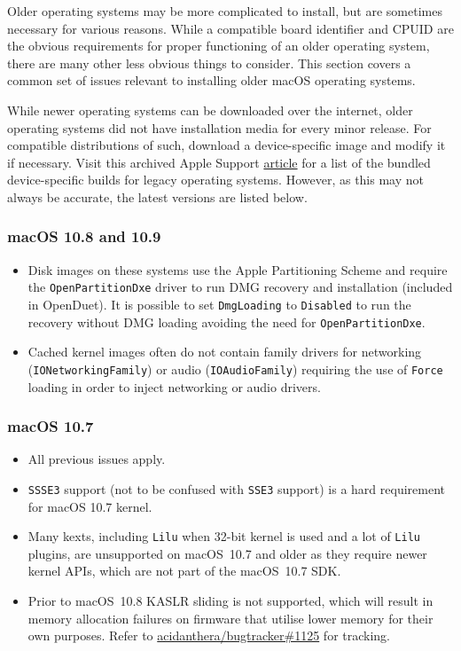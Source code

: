 \documentclass[]{article}
\makeatletter
\renewcommand{\label}[1]{%
\zref@wrapper@immediate{\oldlabel{#1}}}  %
\makeatother
\begin{document}
Older operating systems may be more complicated to install, but are sometimes
necessary for various reasons. While a compatible board identifier
and CPUID are the obvious requirements for proper functioning of an older
operating system, there are many other less obvious things to consider.
This section covers a common set of issues relevant to installing
older macOS operating systems.

While newer operating systems can be downloaded over the internet,
older operating systems did not have installation media for every minor
release. For compatible distributions of such, download a device-specific
image and modify it if necessary. Visit this archived Apple Support
\href{https://web.archive.org/web/20170705003629/https://support.apple.com/en-us/HT204319}{article}
for a list of the bundled device-specific builds for legacy operating systems.
However, as this may not always be accurate, the latest versions are listed below.

\subsubsection{macOS 10.8 and 10.9}\label{legacy108}

\begin{itemize}
  \item Disk images on these systems use the Apple Partitioning Scheme
    and require the \texttt{OpenPartitionDxe} driver to run DMG recovery
    and installation (included in OpenDuet). It is possible to set
    \texttt{DmgLoading} to \texttt{Disabled} to run the recovery
    without DMG loading avoiding the need for \texttt{OpenPartitionDxe}.
  \item Cached kernel images often do not contain family drivers
    for networking (\texttt{IONetworkingFamily}) or audio
    (\texttt{IOAudioFamily}) requiring the use of \texttt{Force}
    loading in order to inject networking or audio drivers.
\end{itemize}

\subsubsection{macOS 10.7}\label{legacy107}

\begin{itemize}
  \item All previous issues apply.
  \item \texttt{SSSE3} support (not to be confused with \texttt{SSE3} support)
    is a hard requirement for macOS 10.7 kernel.
  \item Many kexts, including \texttt{Lilu} when 32-bit kernel
    is used and a lot of \texttt{Lilu} plugins, are
    unsupported on macOS~10.7 and older as they require newer
    kernel APIs, which are not part of the macOS~10.7 SDK.
  \item Prior to macOS~10.8 KASLR sliding is not supported, which
    will result in memory allocation failures on firmware
    that utilise lower memory for their own purposes. Refer to
    \href{https://github.com/acidanthera/bugtracker/issues/1125}{acidanthera/bugtracker\#1125}
    for tracking.
\end{itemize}
\end{document}
